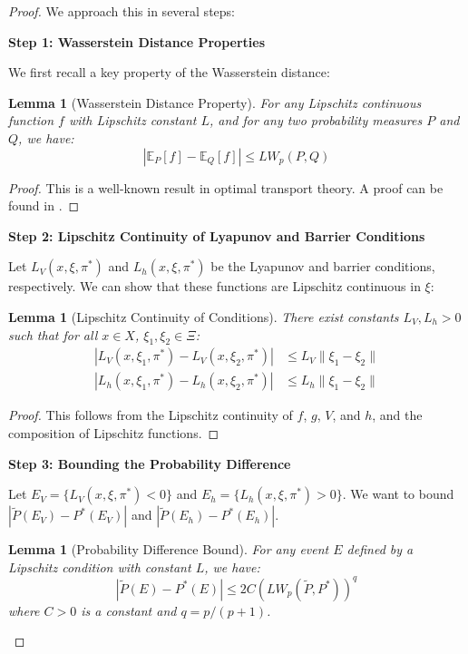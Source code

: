 \documentclass[11pt, oneside]{article}
\newtheorem{lemma}[theorem]{Lemma}
\begin{document}
\begin{proof}
We approach this in several steps:

\textbf{Step 1: Wasserstein Distance Properties}

We first recall a key property of the Wasserstein distance:

\begin{lemma}[Wasserstein Distance Property]
For any Lipschitz continuous function $f$ with Lipschitz constant $L$, and for any two probability measures $P$ and $Q$, we have:
\begin{equation}
    |\mathbb{E}_P[f] - \mathbb{E}_Q[f]| \leq LW_p(P,Q)
\end{equation}
\end{lemma}

\begin{proof}
This is a well-known result in optimal transport theory. A proof can be found in \cite{fournier2015rate}.
\end{proof}

\textbf{Step 2: Lipschitz Continuity of Lyapunov and Barrier Conditions}

Let $L_V(x,\xi,\pi^*)$ and $L_h(x,\xi,\pi^*)$ be the Lyapunov and barrier conditions, respectively. We can show that these functions are Lipschitz continuous in $\xi$:

\begin{lemma}[Lipschitz Continuity of Conditions]
There exist constants $L_V, L_h > 0$ such that for all $x \in X$, $\xi_1, \xi_2 \in \Xi$:
\begin{align}
    |L_V(x,\xi_1,\pi^*) - L_V(x,\xi_2,\pi^*)| &\leq L_V\|\xi_1 - \xi_2\| \\
    |L_h(x,\xi_1,\pi^*) - L_h(x,\xi_2,\pi^*)| &\leq L_h\|\xi_1 - \xi_2\|
\end{align}
\end{lemma}

\begin{proof}
This follows from the Lipschitz continuity of $f$, $g$, $V$, and $h$, and the composition of Lipschitz functions.
\end{proof}

\textbf{Step 3: Bounding the Probability Difference}

Let $E_V = \{L_V(x,\xi,\pi^*) < 0\}$ and $E_h = \{L_h(x,\xi,\pi^*) > 0\}$. We want to bound $|\tilde{P}(E_V) - P^*(E_V)|$ and $|\tilde{P}(E_h) - P^*(E_h)|$.

\begin{lemma}[Probability Difference Bound]
For any event $E$ defined by a Lipschitz condition with constant $L$, we have:
\begin{equation}
    |\tilde{P}(E) - P^*(E)| \leq 2C(LW_p(\tilde{P},P^*))^q
\end{equation}
where $C > 0$ is a constant and $q = p/(p+1)$.
\end{lemma}


\end{proof}
\end{document}
